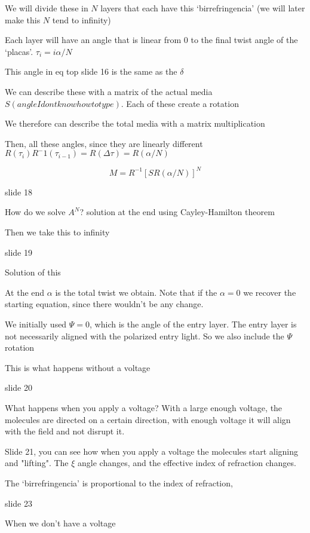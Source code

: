\documentclass[../main/main.tex]{subfiles}
\begin{document}
We will divide these in $N$ layers that each have this `birrefringencia' (we will later make this $N$ tend to infinity)

Each layer will have an angle that is linear from 0 to the final twist angle of the `placas'. $\tau_i =  i \alpha / N$

This angle in eq top slide 16 is the same as the $\delta$

We can describe these with a matrix of the actual media $S(angle I dont know how to type)$. Each of these create a rotation

We therefore can describe the total media with a matrix multiplication

Then, all these angles, since they are linearly different $R(\tau_i)R^-1(\tau_{i-1}) = R(\Delta \tau) = R(\alpha / N)$

\begin{equation}
	M = R^{-1} \left[S R(\alpha/N)\right]^N
\end{equation}

slide 18

How do we solve $A^N$? solution at the end using Cayley-Hamilton theorem

Then we take this to infinity

slide 19

Solution of this

At the end $\alpha$ is the total twist we obtain. Note that if the $\alpha = 0$ we recover the starting equation, since there wouldn't be any change.


We initially used $\Psi = 0$, which is the angle of the entry layer. The entry layer is not necessarily aligned with the polarized entry light. So we also include the $\Psi$ rotation

This is what happens without a voltage

slide 20

What happens when you apply a voltage? With a large enough voltage, the molecules are directed on a certain direction, with enough voltage it will align with the field and not disrupt it.

Slide 21, you can see how when you apply a voltage the molecules start aligning and "lifting". The $\xi$ angle changes, and the effective index of refraction changes.

The `birrefringencia' is proportional to the index of refraction,

slide 23

When we don't have a voltage
\end{document}
